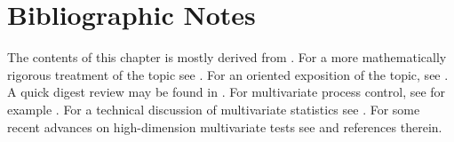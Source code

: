 \section{Bibliographic Notes}
The contents of this chapter is mostly derived from \cite{montgomery_introduction_2007}. 
For a more mathematically rigorous treatment of the topic see \cite{basseville_detection_1993}.
For an \R oriented exposition of the topic, see \cite{qiu_introduction_2013}.
A quick digest review may be found in \cite{natrella_nist/sematech_2010}.
For multivariate process control, see for example \cite{ge_multivariate_2012}. 
For a technical discussion of multivariate statistics see \cite{anderson_introduction_2003}. 
For some recent advances on high-dimension multivariate tests see \cite{srivastava_testing_2013} and references therein.
